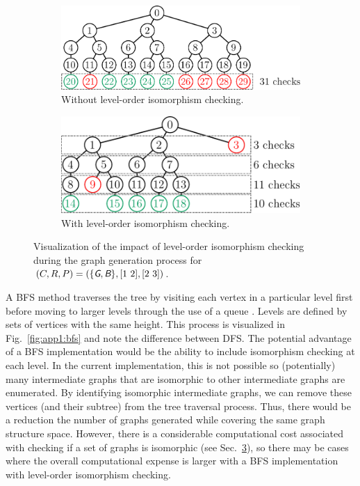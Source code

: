 \begin{figure}[h!]
\centering
\begin{subfigure}[b]{0.5\textwidth}
    \centering
    \includegraphics[scale=0.5]{../app1/fig/isocheck_1}
    \caption{Without level-order isomorphism checking.\label{fig:app1:isocheck_1}}
\end{subfigure}%
\begin{subfigure}[b]{0.5\textwidth}
    \centering
    \includegraphics[scale=0.5]{../app1/fig/isocheck_2}
    \caption{With level-order isomorphism checking.\label{fig:app1:isocheck_2}}
\end{subfigure}
\caption[Visualization of the impact of level-order isomorphism checking.]{Visualization of the impact of level-order isomorphism checking during the graph generation process for $(C,R,P) = (\{\xcolor{G},\xcolor{B}\},[1\ 2],[2\ 3])$.\label{fig:app1:isocheck}}
\end{figure}

A BFS method traverses the tree by visiting each vertex in a particular level first before moving to larger levels through the use of a queue \cite{Skiena2008a, Cormen2009a}.
Levels are defined by sets of vertices with the same height.
This process is visualized in Fig.~\ref{fig:app1:bfs} and note the difference between DFS.
The potential advantage of a BFS implementation would be the ability to include isomorphism checking at each level.
In the current implementation, this is not possible so (potentially) many intermediate graphs that are isomorphic to other intermediate graphs are enumerated.
By identifying isomorphic intermediate graphs, we can remove these vertices (and their subtree) from the tree traversal process.
Thus, there would be a reduction the number of graphs generated while covering the same graph structure space.
However, there is a considerable computational cost associated with checking if a set of graphs is isomorphic (see Sec.~\ref{fig:app1:isocheck}), so there may be cases where the overall computational expense is larger with a BFS implementation with level-order isomorphism checking.

